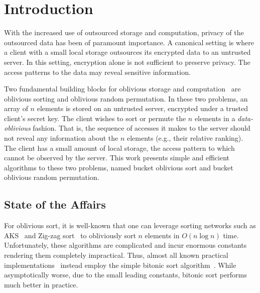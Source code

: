 

\section{Introduction}

With the increased use of outsourced storage and computation, privacy of the outsourced data has been of paramount importance. 
A canonical setting is where a client with a small local
storage outsources its encrypted data to an untrusted server. 
In this setting, encryption alone is not sufficient to preserve privacy.
The access patterns to the data may reveal sensitive information. 

Two fundamental building blocks for oblivious storage and computation~\cite{goldreich1996software,goodrich2011privacy,oblivistore} are oblivious sorting and oblivious random permutation.
In these two problems, an array of $n$ elements is stored on an untrusted server, encrypted under a trusted client's secret key.
The client wishes to sort or permute the $n$ elements in a \emph{data-oblivious} fashion.
That is, the sequence of accesses it makes to the server should not reveal any information about the $n$ elements (e.g., their relative ranking).
The client has a small amount of local storage, the access pattern to which cannot be observed by the server.
This work presents simple and efficient algorithms to these two problems, named bucket oblivious sort and bucket oblivious random permutation.

\subsection{State of the Affairs}
For oblivious sort, it is well-known that one can leverage 
sorting networks such as AKS~\cite{aks} and Zig-zag sort~\cite{zigzag}
to obliviously sort $n$ elements in $O(n\log n)$ time. 
Unfortunately, these algorithms are complicated and incur enormous constants rendering them completely impractical. 
Thus, almost all known practical implementations~\cite{oblivistore,oblivm,graphsc}
instead employ the simple bitonic sort algorithm~\cite{bitonic}. 
While asymptotically worse, due to the small leading constants, bitonic sort performs much better in practice.

